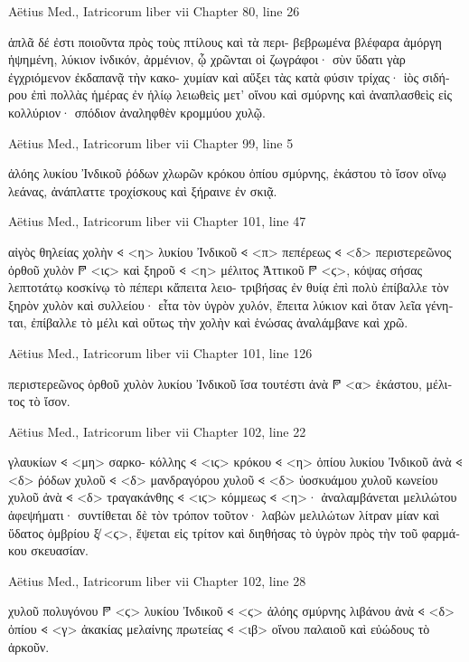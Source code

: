 \documentclass[12pt,letterpaper,twoside,final]{memoir}
\begin{document}
\begin{greek}
Aëtius Med., Iatricorum liber vii 
Chapter 80, line 26

                ἁπλᾶ δέ ἐστι ποιοῦντα πρὸς τοὺς πτίλους καὶ τὰ περι-
βεβρωμένα βλέφαρα ἀμόργη ἡψημένη, λύκιον ἰνδικόν, ἀρμένιον, ᾧ 
χρῶνται οἱ ζωγράφοι· σὺν ὕδατι γὰρ ἐγχριόμενον ἐκδαπανᾷ τὴν κακο-
χυμίαν καὶ αὔξει τὰς κατὰ φύσιν τρίχας· ἰὸς σιδήρου ἐπὶ πολλὰς 
ἡμέρας ἐν ἡλίῳ λειωθεὶς μετ' οἴνου καὶ σμύρνης καὶ ἀναπλασθεὶς εἰς 
κολλύριον· σπόδιον ἀναληφθὲν κρομμύου χυλῷ. 



Aëtius Med., Iatricorum liber vii 
Chapter 99, line 5

           ἀλόης λυκίου Ἰνδικοῦ ῥόδων χλωρῶν κρόκου ὀπίου σμύρνης, 
ἑκάστου τὸ ἴσον οἴνῳ λεάνας, ἀνάπλαττε τροχίσκους καὶ ξήραινε ἐν 
σκιᾷ. 



Aëtius Med., Iatricorum liber vii 
Chapter 101, line 47

                            αἰγὸς θηλείας χολὴν 𐅻 <η> λυκίου Ἰνδικοῦ 𐅻 <π> 
πεπέρεως 𐅻 <δ> περιστερεῶνος ὀρθοῦ χυλὸν 𐆄 <ιϛ> καὶ ξηροῦ 𐅻 <η> μέλιτος 
Ἀττικοῦ 𐆄 <ϛ>, κόψας σήσας λεπτοτάτῳ κοσκίνῳ τὸ πέπερι κἄπειτα λειο-
τριβήσας ἐν θυίᾳ ἐπὶ πολὺ ἐπίβαλλε τὸν ξηρὸν χυλὸν καὶ συλλείου· 
εἶτα τὸν ὑγρὸν χυλόν, ἔπειτα λύκιον καὶ ὅταν λεῖα γένηται, ἐπίβαλλε 
τὸ μέλι καὶ οὕτως τὴν χολὴν καὶ ἑνώσας ἀναλάμβανε καὶ χρῶ. 



Aëtius Med., Iatricorum liber vii 
Chapter 101, line 126

                        περιστερεῶνος ὀρθοῦ χυλὸν λυκίου Ἰνδικοῦ ἴσα 
τουτέστι ἀνὰ 𐆄 <α> ἑκάστου, μέλιτος τὸ ἴσον. 



Aëtius Med., Iatricorum liber vii 
Chapter 102, line 22

                                                 γλαυκίων 𐅻 <μη> σαρκο-
κόλλης 𐅻 <ιϛ> κρόκου 𐅻 <η> ὀπίου λυκίου Ἰνδικοῦ ἀνὰ 𐅻 <δ> ῥόδων χυλοῦ 
𐅻 <δ> μανδραγόρου χυλοῦ 𐅻 <δ> ὑοσκυάμου χυλοῦ κωνείου χυλοῦ ἀνὰ 
𐅻 <δ> τραγακάνθης 𐅻 <ιϛ> κόμμεως 𐅻 <η>· ἀναλαμβάνεται μελιλώτου 
ἀφεψήματι· συντίθεται δὲ τὸν τρόπον τοῦτον· λαβὼν μελιλώτων 
λίτραν μίαν καὶ ὕδατος ὀμβρίου ξ̸ <ϛ>, ἕψεται εἰς τρίτον καὶ διηθήσας 
τὸ ὑγρὸν πρὸς τὴν τοῦ φαρμάκου σκευασίαν. 



Aëtius Med., Iatricorum liber vii 
Chapter 102, line 28

            χυλοῦ πολυγόνου 𐆄 <ϛ> λυκίου Ἰνδικοῦ 𐅻 <ϛ> ἀλόης σμύρνης 
λιβάνου ἀνὰ 𐅻 <δ> ὀπίου 𐅻 <γ> ἀκακίας μελαίνης πρωτείας 𐅻 <ιβ> οἴνου 
παλαιοῦ καὶ εὐώδους τὸ ἀρκοῦν. 




\end{greek}
\end{document}
